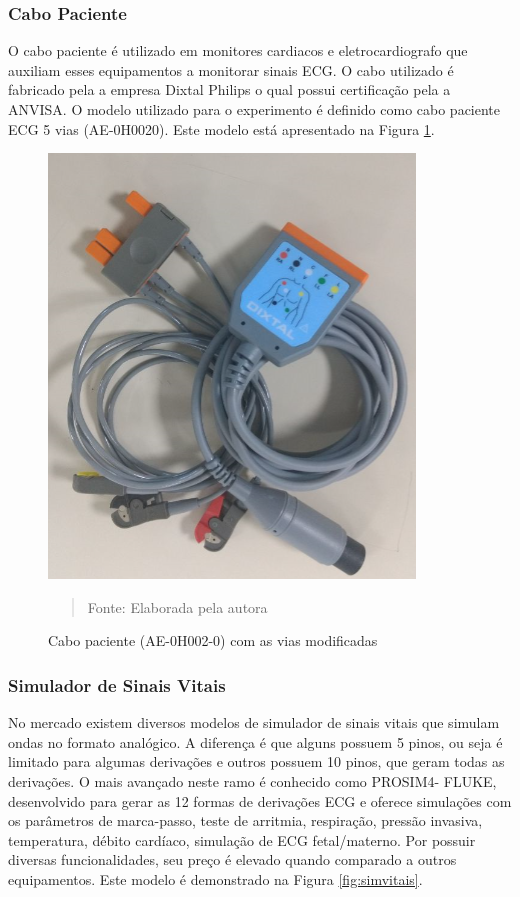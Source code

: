 \documentclass[12pt, a4paper]{article}
\begin{document}
\subsubsection{Cabo Paciente}
\hspace*{0.8cm} O cabo paciente é utilizado em monitores cardiacos e eletrocardiografo que auxiliam esses equipamentos a monitorar sinais ECG. O cabo utilizado é fabricado pela a empresa Dixtal Philips o qual possui certificação pela a ANVISA. O modelo utilizado para o experimento é definido como cabo paciente ECG 5 vias (AE-0H0020). Este modelo está apresentado na Figura \ref{fig:cabopaciente}.
\begin{figure}[H]
\begin{center}
			\caption{Cabo paciente (AE-0H002-0) com as vias modificadas}
			\includegraphics[width=.5\textwidth]{Figuras/Cabopaciente.PNG}
 			\vspace*{\fill} 
            \begin{quote} 
            \centering 
           Fonte: Elaborada pela autora
            \end{quote}
            \vspace*{\fill}
			\label{fig:cabopaciente}
\end{center}
\end{figure}

\subsubsection{Simulador de Sinais Vitais}
\hspace*{0.8cm} No mercado existem diversos modelos de simulador de sinais vitais que simulam ondas no formato analógico. A diferença é que alguns possuem 5 pinos, ou seja é limitado para algumas derivações e outros possuem 10 pinos, que geram todas as derivações. O mais avançado neste ramo é conhecido como PROSIM4- FLUKE, desenvolvido para gerar as 12 formas de derivações ECG e oferece simulações com os parâmetros de marca-passo, teste de arritmia, respiração, pressão invasiva, temperatura, débito cardíaco, simulação de ECG fetal/materno. Por possuir diversas funcionalidades, seu preço é elevado quando comparado a outros equipamentos. Este modelo é demonstrado na Figura \ref{fig:simvitais}.
\end{document}
